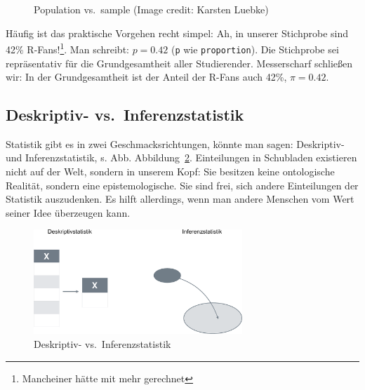 \documentclass[
  a4paper,
  DIV=11]{scrreprt}
\theoremstyle{definition}
\theoremstyle{remark}
\begin{document}
\begin{figure}
\begin{minipage}[t]{0.50\linewidth}
{{}

}

\end{minipage}%

\caption{\label{fig-pop-sample}Population vs.~sample (Image credit:
Karsten Luebke)}

\end{figure}

Häufig ist das praktische Vorgehen recht simpel: Ah, in unserer
Stichprobe sind 42\% R-Fans!\footnote{Mancheiner hätte mit mehr
  gerechnet}. Man schreibt: \(p = 0.42\) (\texttt{p} wie
\texttt{proportion}). Die Stichprobe sei repräsentativ für die
Grundgesamtheit aller Studierender. Messerscharf schließen wir: In der
Grundgesamtheit ist der Anteil der R-Fans auch 42\%, \(\pi=0.42\).

\hypertarget{deskriptiv--vs.-inferenzstatistik}{%
\subsection{Deskriptiv-
vs.~Inferenzstatistik}\label{deskriptiv--vs.-inferenzstatistik}}

Statistik gibt es in zwei Geschmacksrichtungen, könnte man sagen:
Deskriptiv- und Inferenzstatistik, s. Abb. Abbildung~\ref{fig-inf1}.
Einteilungen in Schubladen existieren nicht auf der Welt, sondern in
unserem Kopf: Sie besitzen keine ontologische Realität, sondern eine
epistemologische. Sie sind frei, sich andere Einteilungen der Statistik
auszudenken. Es hilft allerdings, wenn man andere Menschen vom Wert
seiner Idee überzeugen kann.

\begin{figure}

{\centering \includegraphics[width=0.7\textwidth,height=\textheight]{./img/desk_vs_inf-crop.png}

}

\caption{\label{fig-inf1}Deskriptiv- vs.~Inferenzstatistik}

\end{figure}
\end{document}

